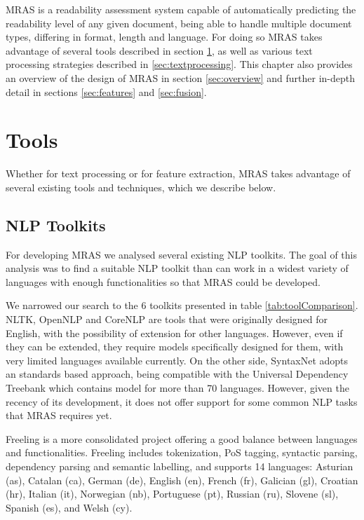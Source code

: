 \documentclass{bsu-ms}
\newcommand{\projectName}{MRAS\xspace}
\begin{document}
\projectName is a readability assessment system capable of automatically predicting the readability level of any given document, being able to handle multiple document types, differing in format, length and language. For doing so \projectName takes advantage of several tools described in section \ref{sec:tools}, as well as various text processing strategies described in \ref{sec:textprocessing}. This chapter also provides an overview of the design of \projectName in section \ref{sec:overview} and further in-depth detail in sections \ref{sec:features} and \ref{sec:fusion}.






\section{Tools}
\label{sec:tools}

Whether for text processing or for feature extraction, \projectName takes advantage of several existing tools and techniques, which we describe below.

\subsection{NLP Toolkits}
For developing \projectName we analysed several existing NLP toolkits. The goal of this analysis was to find a suitable NLP toolkit than can work in a widest variety of languages with enough functionalities so that \projectName could be developed.

We narrowed our search to the 6 toolkits presented in table \ref{tab:toolComparison}. NLTK,  OpenNLP and CoreNLP are  tools that were originally designed for English, with the possibility of extension for other languages. However, even if they can be extended, they require models specifically designed for them, with very limited languages available currently. On the other side, SyntaxNet adopts an standards based approach, being compatible with the Universal Dependency Treebank \cite{universaldependencies} which contains model for more than 70 languages. However, given the recency of its development, it does not offer support for some common NLP tasks that \projectName requires yet. 

Freeling is a more consolidated project offering a good balance between languages and functionalities. Freeling includes tokenization, PoS tagging, syntactic parsing, dependency parsing and semantic labelling, and supports 14 languages: Asturian (as), Catalan (ca), German (de), English (en),  French (fr), Galician (gl), Croatian (hr), Italian (it), Norwegian (nb), Portuguese (pt), Russian (ru), Slovene (sl), Spanish (es), and Welsh (cy). 
\end{document}
